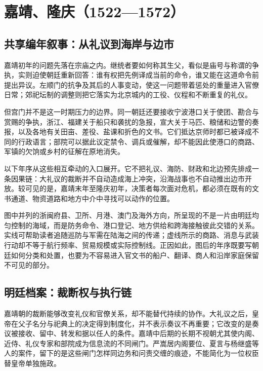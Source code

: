 \chapter{嘉靖、隆庆（1522—1572）}
\label{ch:jiajing-longqing}

\section{共享编年叙事：从礼议到海岸与边市}

嘉靖初年的问题先落在宗庙之内。继统者要如何称其生父，看似是庙号与称谓的争执，实则迫使朝廷重新回答：谁有权把先例译成当前的命令，谁又能在这道命令前提出异议。左顺门的抗争及其后的人事变动，使这一问题带着惩处的重量进入官僚日常；郊祀坛制的调整则把它落实为北京城内的工役、仪程和不断重复的礼仪。

但宫门并不是这一时期压力的边界。同一朝廷还要接收宁波港口关于使团、勘合与赏赐的争执，浙江、福建关于船只和袭扰的急报，宣大关于马匹、粮储和边警的奏报，以及各地有关田亩、差役、盐课和折色的文书。它们抵达京师时都已被译成不同的行政语言；部院可以据此议定禁令、调兵或催解，却不能因此使港口的商路、军镇的欠饷或乡村的征解在原地消失。

以下年序从这些相互牵动的入口展开。它不把礼议、海防、财政和北边预先排成一条因果链：大礼议的裁断并不自动造成海上冲突，沿海战事也不自动推出边市开放。较可见的是，嘉靖末年至隆庆初年，决策者每次面对危机，都必须在既有的文书通道、物资道路和地方中介中寻找可以动作的位置。




\noindent 图中并列的浙闽府县、卫所、月港、澳门及海外方向，所呈现的不是一片由明廷均匀控制的海域，而是防务命令、港口登记、地方供给和跨海接触彼此交错的关系。实线可帮助读者追随巡防与军需在陆海之间的传递；虚线所示的商路、消息与武装行动却不等于航行频率、贸易规模或实际控制线。正因如此，图后的年序既要写朝廷如何分类和处置，也要为不容易进入官文书的船户、翻译、商人和沿岸家庭保留不可见的部分。

\section{明廷档案：裁断权与执行链}

嘉靖朝的裁断能够改变礼仪和官僚关系，却不能替代持续的协作。大礼议之后，皇帝在父子名分与祀典上的决定得到制度化，并不表示奏议不再重要；它改变的是奏议被接收、留中、转发和据以任人的条件。嘉靖中后期的长期不视朝尤其使内阁、近侍、礼仪专家和部院成为信息流的不同闸门。严嵩居内阁要位、夏言与杨继盛等人的案件，留下的是这些闸门怎样同边务和问责交缠的痕迹，不能简化为一位权臣替皇帝单独施政。


